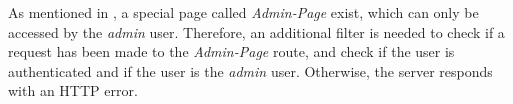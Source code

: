 As mentioned in , a special page called \textit{Admin-Page} exist, which can only be accessed by the \textit{admin} user. Therefore, an additional filter is needed to check if a request has been made to the \textit{Admin-Page} route, and check if the user is authenticated and if the user is the \textit{admin} user. Otherwise, the server responds with an HTTP error.
